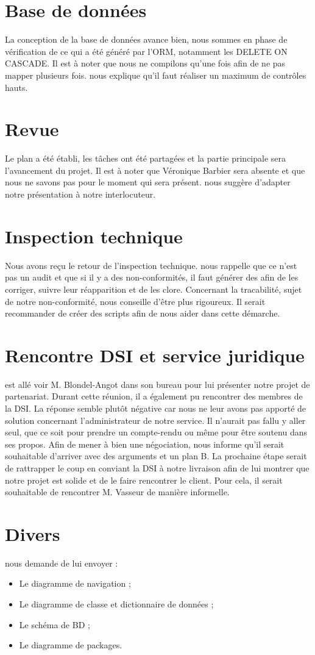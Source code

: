 \documentclass [a4paper] {article}
\begin{document}
\section{Base de données}
La conception de la base de données avance bien, nous sommes en phase de vérification de ce qui a été généré par l'ORM, notamment les DELETE ON CASCADE. Il est à noter que nous ne compilons qu'une fois afin de ne pas mapper plusieurs fois. \nomTuteurPedago{} nous explique qu'il faut réaliser un maximum de contrôles hauts.

\section{Revue}
Le plan a été établi, les tâches ont été partagées et la partie principale sera l'avancement du projet. Il est à noter que Véronique Barbier sera absente et que nous ne savons pas pour le moment qui sera présent. \nomTuteurPedago{} nous suggère d'adapter notre présentation à notre interlocuteur.

\section{Inspection technique}
Nous avons reçu le retour de l'inspection technique. \nomTuteurPedago{} nous rappelle que ce n'est pas un audit et que si il y a des non-conformités, il faut générer des \FT{} afin de les corriger, suivre leur réapparition et de les clore.
Concernant la tracabilité, sujet de notre non-conformité, \nomTuteurPedago{} nous conseille d'être plus rigoureux. Il serait recommander de créer des scripts afin de nous aider dans cette démarche.


\section{Rencontre DSI et service juridique}
\Sergi{} est allé voir M. Blondel-Angot dans son bureau pour lui présenter notre projet de partenariat. Durant cette réunion, il a également pu rencontrer des membres de la DSI. La réponse semble plutôt négative car nous ne leur avons pas apporté de solution concernant l'administrateur de notre service. Il n'aurait pas fallu y aller seul, que ce soit pour prendre un compte-rendu ou même pour être soutenu dans ses propos. Afin de mener à bien une négociation, \nomTuteurPedago{} nous informe qu'il serait souhaitable d'arriver avec des arguments et un plan B. La prochaine étape serait de rattrapper le coup en conviant la DSI à notre livraison afin de lui montrer que notre projet  est solide et de le faire rencontrer le client. Pour cela, il serait souhaitable de rencontrer M. Vasseur de manière informelle.


\section{Divers}
\nomTuteurPedago{} nous demande de lui envoyer : 
\begin{itemize}
\item Le diagramme de navigation ;
\item Le diagramme de classe et dictionnaire de données ;
\item Le schéma de BD ;
\item Le diagramme de packages.
\end{itemize}



\newpage
\end{document}
